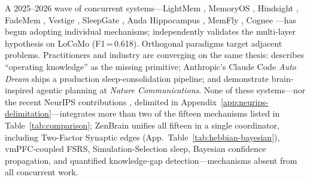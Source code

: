 \documentclass{article}
\begin{document}
A 2025--2026 wave of concurrent systems---LightMem
\citep{liu2025lightmem}, MemoryOS \citep{xu2025memoryos}, Hindsight
\citep{li2025hindsight}, FadeMem \citep{wang2026fadem}, Vestige
\citep{vestige2026}, SleepGate \citep{xie2026sleepgate}, Anda Hippocampus
\citep{anda2026hippocampus}, MemFly \citep{memfly2026}, Cognee
\citep{markovic2025cognee}---has begun adopting individual mechanisms;
\citet{tiwari2026multilayered} independently validates the multi-layer
hypothesis on LoCoMo (F1\,=\,0.618). Orthogonal paradigms
\citep{omega2026,mastra2025,mempalace2025,lmneedsleep2026,iclr2026memagents}
target adjacent problems. Practitioners and industry are converging
on the same thesis: \citet{karpathy2026knowledge} describes ``operating
knowledge'' as the missing primitive; Anthropic's Claude Code
\emph{Auto Dream} \citep{anthropic2026autodream} ships a production
sleep-consolidation pipeline; and \citet{webb2025brain} demonstrate
brain-inspired agentic planning at \emph{Nature Communications}.
None of these systems---nor the recent NeurIPS contributions
\citep{gutierrez2024hipporag,zhang2025gmemory,koch2025tmma}, delimited
in Appendix~\ref{app:neurips-delimitation}---integrates more than two
of the fifteen mechanisms listed in Table~\ref{tab:comparison};
ZenBrain unifies all fifteen in a single coordinator, including
Two-Factor Synaptic edges (App.~Table~\ref{tab:hebbian-bayesian}),
vmPFC-coupled FSRS, Simulation-Selection sleep, Bayesian confidence
propagation, and quantified knowledge-gap detection---mechanisms absent
from all concurrent work.
\end{document}
